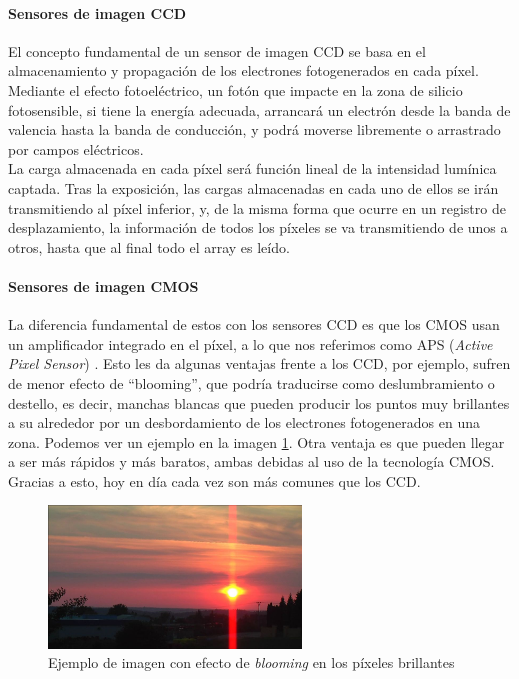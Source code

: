 \paragraph{Sensores de imagen CCD}
El concepto fundamental de un sensor de imagen CCD se basa en el almacenamiento
y propagación de los electrones fotogenerados en cada píxel. Mediante el efecto
fotoeléctrico, un fotón que impacte en la zona de silicio fotosensible, si tiene
la energía adecuada, arrancará un electrón desde la banda de valencia hasta la
banda de conducción, y podrá moverse libremente o arrastrado por campos eléctricos.\\

La carga almacenada en cada píxel será función lineal de la intensidad lumínica
captada. Tras la exposición, las cargas almacenadas en cada uno de ellos
se irán transmitiendo al píxel inferior, y, de la misma forma que ocurre en un
registro de desplazamiento, la información de todos los píxeles se va transmitiendo
de unos a otros, hasta que al final todo el array es leído.\cite{Nakamura2005}\\

\paragraph{Sensores de imagen CMOS}
La diferencia fundamental de estos con los sensores CCD es que los CMOS usan un
amplificador integrado en el píxel, a lo que nos referimos como APS (\textit{Active Pixel Sensor})
\cite{Fossum1993}. Esto les da algunas ventajas
frente a los CCD, por ejemplo, sufren de menor efecto de ``blooming'', que podría
traducirse como deslumbramiento o destello, es decir, manchas blancas que pueden
producir los puntos muy brillantes a su alrededor por un desbordamiento de los
electrones fotogenerados en una zona. Podemos ver un ejemplo en la
imagen \ref{fig:blooming}.
Otra ventaja es que pueden llegar a ser más rápidos y más baratos, ambas debidas
al uso de la tecnología CMOS. Gracias a esto, hoy en día cada vez son más comunes que los
CCD.\\

\begin{figure}[h]
	\centering
	\includegraphics[width=0.6\textwidth]{img/blooming.jpg}
	\caption[Explicación gráfica del efecto blooming en una imagen]
	{Ejemplo de imagen con efecto de \textit{blooming} en los píxeles brillantes
	\protect\footnotemark}
	\label{fig:blooming}
\end{figure}

